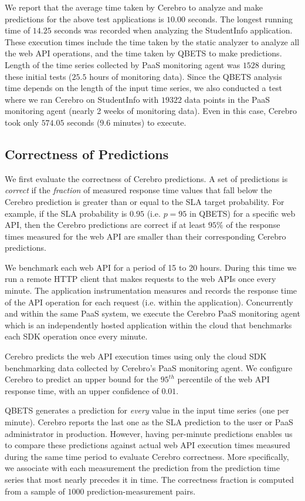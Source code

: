 We report that the average time taken by Cerebro to analyze and make predictions for the above
test applications is $10.00$ seconds. The longest running time of
$14.25$ seconds was recorded when analyzing the StudentInfo application.
These execution times include the time taken
by the static analyzer to analyze all the web API operations,
and the time taken by QBETS to make predictions. Length of the time series collected by PaaS
monitoring agent was $1528$ during these initial tests ($25.5$ hours of monitoring data). Since the QBETS
analysis time depends on the length of the input time series, we also conducted a test where
we ran Cerebro on StudentInfo with $19322$ data points in the PaaS monitoring
agent (nearly 2 weeks of monitoring data). Even in this case, Cerebro took only $574.05$ seconds 
($9.6$ minutes) to execute.

\subsection{Correctness of Predictions}
\label{sec:correctness}

We first evaluate the correctness of Cerebro predictions.  A set of
predictions is \textit{correct} if the \textit{fraction} of measured 
response time values that fall below the Cerebro prediction is greater than 
or equal to the SLA target probability. 
For example, if the SLA probability is $0.95$ (i.e. $p=95$ in QBETS) for
a specific web API, then the Cerebro predictions are correct if at least
$95\%$ of the response times measured for the web API are smaller than their
corresponding Cerebro predictions. 

We benchmark each web API for a period of 15 to 20 hours.  During this time we
run a remote HTTP client that makes requests to the web APIs once every
minute.  The application instrumentation measures and records the response
time of the API operation for each request (i.e. within the application).
Concurrently and within the same PaaS system, we execute the Cerebro
PaaS monitoring agent which is an independently hosted application within the
cloud that benchmarks each SDK operation once every minute.

Cerebro predicts the web API execution times using only the cloud SDK
benchmarking data collected by Cerebro's PaaS monitoring agent. 
We configure Cerebro to predict an
upper bound for the $95^{th}$ percentile of the web API response time, with an
upper confidence of $0.01$. 

QBETS generates a prediction for \textit{every} value in the input time series 
(one per minute).  Cerebro reports the last one as the SLA prediction to the
user or PaaS administrator in production.  However, having per-minute predictions 
enables us to compare these predictions against actual web API execution
times measured during the same time period to evaluate Cerebro correctness. 
More specifically, we
associate with each measurement the prediction from the prediction time series
that most nearly precedes it in time.  The correctness fraction is computed
from a sample of $1000$ prediction-measurement pairs.

